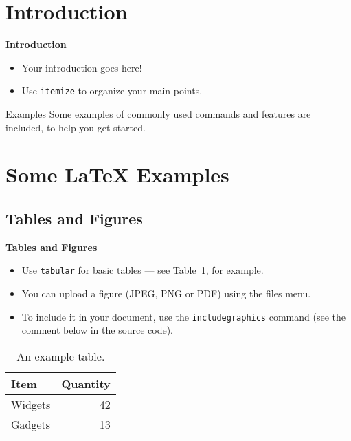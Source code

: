 \documentclass{beamer}
\begin{document}
\section{Introduction}
\begin{frame}{\textbf{Introduction}}
\vspace{3.5mm}

\begin{itemize}
  \item Your introduction goes here!
  \item Use \texttt{itemize} to organize your main points.
\end{itemize}

\vskip 1cm

\begin{block}{Examples}
Some examples of commonly used commands and features are included, to help you get started.
\end{block}

\end{frame}
\section{Some \LaTeX{} Examples}

\subsection{Tables and Figures}

\begin{frame}{\textbf{Tables and Figures}}
\vspace{3.5mm}
\begin{itemize}
\item Use \texttt{tabular} for basic tables --- see Table~\ref{tab:widgets}, for example.
\item You can upload a figure (JPEG, PNG or PDF) using the files menu. 
\item To include it in your document, use the \texttt{includegraphics} command (see the comment below in the source code).
\end{itemize}


\begin{table}
\centering
\begin{tabular}{l|r}
Item & Quantity \\\hline
Widgets & 42 \\
Gadgets & 13
\end{tabular}
\caption{\label{tab:widgets}An example table.}
\end{table}

\end{frame}
\end{document}

